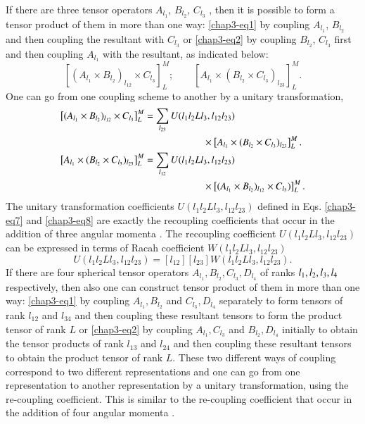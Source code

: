 If there are three tensor operators $A_{l_1}$, $B_{l_2}$, $C_{l_3}$ , then it is possible to form a tensor product of them in more than one way: \eqref{chap3-eq1} by coupling $A_{l_1}$, $B_{l_2}$ and then coupling the resultant with $C_{l_3}$ or \eqref{chap3-eq2} by coupling $B_{l_2}$, $C_{l_3}$ first and then coupling $A_{l_1}$ with the resultant, as indicated below:
\begin{equation}
\left[ (A_{l_1} \times B_{l_2})_{l_{12}} \times C_{l_3}\right]^M_L;  \qquad \left[ A_{l_1} \times (B_{l_2} \times C_{l_3})_{l_{23}}\right]^M_L. \label{chap3-eq6}
\end{equation}
One can go from one coupling scheme to another by a unitary transformation,
\begin{align}
\left[ (A_{l_1} \times B_{l_2})_{l_{12}} \times C_{l_3}\right]^M_L  & = \sum_{l_{23}} U (l_1 l_2 L l_3, l_{12} l_{23})\notag \\ 
& \qquad \qquad \qquad \times \left[A_{l_1} \times (B_{l_2} \times C_{l_3})_{l_{23}} \right]^M_L. \label{chap3-eq7}\\ 
\left[ A_{l_1} \times (B_{l_2} \times C_{l_3})_{l_{23}}\right]^M_L & = \sum_{l_{12}} U (l_1 l_2 L l_3, l_{12} l_{23}) \notag \\
& \qquad \qquad \qquad \times \left[(A_{l_1} \times B_{l_2})_{l_{12}} \times C_{l_3}) \right]^M_L. \label{chap3-eq8} 
\end{align}
The unitary transformation coefficients $U (l_1 l_2 L l_3, l_{12} l_{23})$ defined in Eqs. \eqref{chap3-eq7} and \eqref{chap3-eq8} are exactly the recoupling coefficients that occur in the addition of three angular momenta \cite{chap3-key11,chap3-key12}. The recoupling coefficient $U (l_1 l_2 Ll_3 , l_{12} l_{23})$ can be expressed in terms of Racah coefficient $W (l_1 l_2 Ll_3 , l_{12} l_{23})$ 
\begin{equation}
U (l_1 l_2 Ll_3 , l_{12} l_{23}) = [l_{12}][l_{23}] W (l_{1} l_2 Ll_3 , l_{12} l_{23}). \label{chap3-eq9}
\end{equation}
If there are four spherical tensor operators $A_{l_1}, B_{l_2}, C_{l_3}, D_{l_4}$ of ranks $l_1, l_2,\break l_3, l_4$ respectively, then also one can construct tensor product of them in more than one way: \eqref{chap3-eq1} by coupling $A_{l_1}, B_{l_2}$ and $C_{l_3}, D_{l_4}$ separately to form tensors of rank $l_{12}$ and $l_{34}$ and then coupling these resultant tensors to form the product tensor of rank $L$ or \eqref{chap3-eq2} by coupling $A_{l_1}, C_{l_3}$ and $B_{l_2}, D_{l_4}$ initially to obtain the tensor products of rank $l_{13}$ and $l_{24}$ and then coupling these resultant tensors to obtain the product tensor of rank $L$. These two different ways of coupling correspond to two different representations and one can go from one representation to another representation by a unitary transformation, using the re-coupling coefficient. This is similar to the re-coupling coefficient that occur in the addition of four angular momenta \cite{chap3-key11,chap3-key12}.


